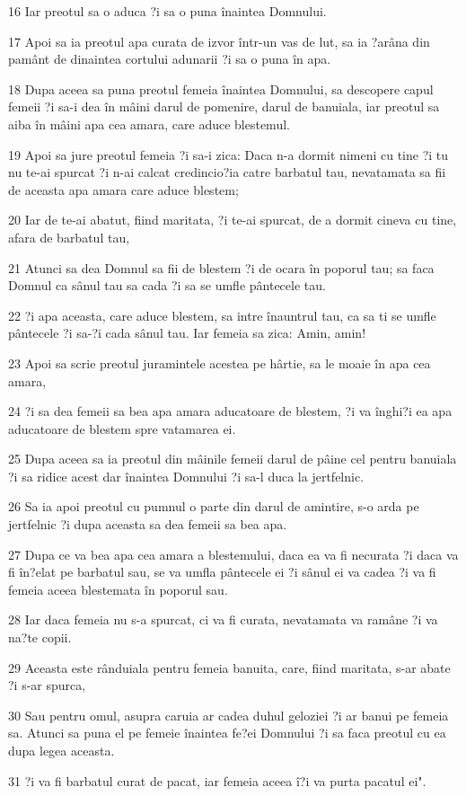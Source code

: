 \par 16 Iar preotul sa o aduca ?i sa o puna înaintea Domnului.
\par 17 Apoi sa ia preotul apa curata de izvor într-un vas de lut, sa ia ?arâna din pamânt de dinaintea cortului adunarii ?i sa o puna în apa.
\par 18 Dupa aceea sa puna preotul femeia înaintea Domnului, sa descopere capul femeii ?i sa-i dea în mâini darul de pomenire, darul de banuiala, iar preotul sa aiba în mâini apa cea amara, care aduce blestemul.
\par 19 Apoi sa jure preotul femeia ?i sa-i zica: Daca n-a dormit nimeni cu tine ?i tu nu te-ai spurcat ?i n-ai calcat credincio?ia catre barbatul tau, nevatamata sa fii de aceasta apa amara care aduce blestem;
\par 20 Iar de te-ai abatut, fiind maritata, ?i te-ai spurcat, de a dormit cineva cu tine, afara de barbatul tau,
\par 21 Atunci sa dea Domnul sa fii de blestem ?i de ocara în poporul tau; sa faca Domnul ca sânul tau sa cada ?i sa se umfle pântecele tau.
\par 22 ?i apa aceasta, care aduce blestem, sa intre înauntrul tau, ca sa ti se umfle pântecele ?i sa-?i cada sânul tau. Iar femeia sa zica: Amin, amin!
\par 23 Apoi sa scrie preotul juramintele acestea pe hârtie, sa le moaie în apa cea amara,
\par 24 ?i sa dea femeii sa bea apa amara aducatoare de blestem, ?i va înghi?i ea apa aducatoare de blestem spre vatamarea ei.
\par 25 Dupa aceea sa ia preotul din mâinile femeii darul de pâine cel pentru banuiala ?i sa ridice acest dar înaintea Domnului ?i sa-l duca la jertfelnic.
\par 26 Sa ia apoi preotul cu pumnul o parte din darul de amintire, s-o arda pe jertfelnic ?i dupa aceasta sa dea femeii sa bea apa.
\par 27 Dupa ce va bea apa cea amara a blestemului, daca ea va fi necurata ?i daca va fi în?elat pe barbatul sau, se va umfla pântecele ei ?i sânul ei va cadea ?i va fi femeia aceea blestemata în poporul sau.
\par 28 Iar daca femeia nu s-a spurcat, ci va fi curata, nevatamata va ramâne ?i va na?te copii.
\par 29 Aceasta este rânduiala pentru femeia banuita, care, fiind maritata, s-ar abate ?i s-ar spurca,
\par 30 Sau pentru omul, asupra caruia ar cadea duhul geloziei ?i ar banui pe femeia sa. Atunci sa puna el pe femeie înaintea fe?ei Domnului ?i sa faca preotul cu ea dupa legea aceasta.
\par 31 ?i va fi barbatul curat de pacat, iar femeia aceea î?i va purta pacatul ei".

